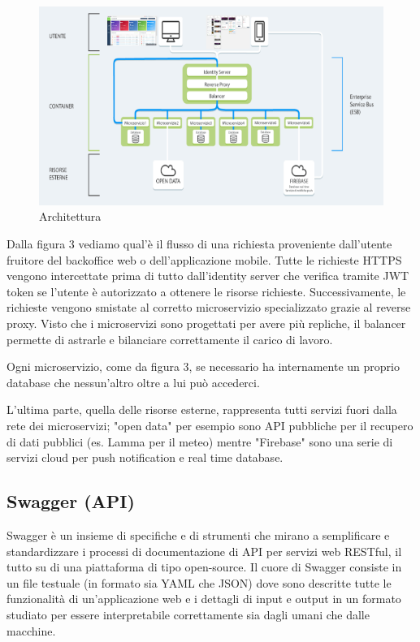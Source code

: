 \begin{figure}[h!]
    \centering  
    \caption{Architettura}
    \includegraphics[scale=0.5]{img/cap1/architecture}
\end{figure}

Dalla figura 3 vediamo qual'è il flusso di una richiesta proveniente dall'utente fruitore del backoffice web o
dell'applicazione mobile.
Tutte le richieste HTTPS vengono intercettate prima di tutto dall'identity server che verifica tramite JWT token
se l'utente è autorizzato a ottenere le risorse richieste.
Successivamente, le richieste vengono smistate al corretto microservizio specializzato grazie al reverse proxy.
Visto che i microservizi sono progettati per avere più repliche, il balancer permette di astrarle e bilanciare correttamente
il carico di lavoro.

Ogni microservizio, come da figura 3, se necessario ha internamente un proprio database
che nessun'altro oltre a lui può accederci.

L'ultima parte, quella delle risorse esterne, rappresenta tutti servizi fuori dalla rete
dei microservizi; "open data" per esempio sono API pubbliche per il recupero di dati pubblici (es. Lamma per il meteo)
mentre "Firebase" sono una serie di servizi cloud per push notification e real time database.

\subsection{Swagger (API)}
Swagger è un insieme di specifiche e di strumenti che mirano a semplificare e
standardizzare i processi di documentazione di API per servizi web RESTful, il tutto su
di una piattaforma di tipo open-source.
Il cuore di Swagger consiste in un file testuale (in formato sia YAML che JSON) dove
sono descritte tutte le funzionalità di un’applicazione web e i dettagli di input e output
in un formato studiato per essere interpretabile correttamente sia dagli umani che
dalle macchine.
